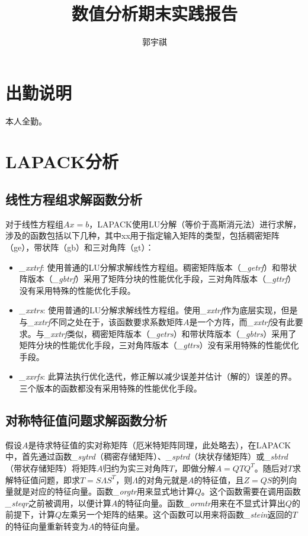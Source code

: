 \documentclass[a4paper]{article}
\begin{document}
\title{数值分析期末实践报告}
\author{郭宇祺}
\date{}
\maketitle
\normalsize
\section{出勤说明}
本人全勤。

\section{LAPACK分析}
\subsection{线性方程组求解函数分析}
对于线性方程组$Ax=b$，LAPACK使用LU分解（等价于高斯消元法）进行求解，涉及的函数包括以下几种，其中xx用于指定输入矩阵的类型，包括稠密矩阵（ge），带状阵（gb）和三对角阵（gt）：
\begin{itemize}
  \item \emph{\_xxtrf}: 使用普通的LU分解求解线性方程组。稠密矩阵版本（\emph{\_getrf}）和带状阵版本（\emph{\_gbtrf}）采用了矩阵分块的性能优化手段，三对角阵版本（\emph{\_gttrf}）没有采用特殊的性能优化手段。
  \item \emph{\_xxtrs}: 使用普通的LU分解求解线性方程组。使用\emph{\_xxtrf}作为底层实现，但是与\emph{\_xxtrf}不同之处在于，该函数要求系数矩阵$A$是一个方阵，而\emph{\_xxtrf}没有此要求。与\emph{\_xxtrf}类似，稠密矩阵版本（\emph{\_getrs}）和带状阵版本（\emph{\_gbtrs}）采用了矩阵分块的性能优化手段，三对角阵版本（\emph{\_gttrs}）没有采用特殊的性能优化手段。
  \item \emph{\_xxrfs}: 此算法执行优化迭代，修正解以减少误差并估计（解的）误差的界。三个版本的函数都没有采用特殊的性能优化手段。
\end{itemize}

\subsection{对称特征值问题求解函数分析}

假设$A$是待求特征值的实对称矩阵（厄米特矩阵同理，此处略去），在LAPACK中，首先通过函数\emph{\_sytrd}（稠密存储矩阵）、\emph{\_sptrd}（块状存储矩阵）或\emph{\_sbtrd}（带状存储矩阵）将矩阵$A$归约为实三对角阵$T$，即做分解$A=QTQ^T$。随后对$T$求解特征值问题，即求$T=S\Lambda S^T$，则$\Lambda$的对角元就是$A$的特征值，且$Z=QS$的列向量就是对应的特征向量。函数\emph{\_orgtr}用来显式地计算$Q$。这个函数需要在调用函数\emph{\_steqr}之前被调用，以便计算$A$的特征向量。函数\emph{\_ormtr}用来在不显式计算出$Q$的前提下，计算$Q$左乘另一个矩阵的结果。这个函数可以用来将函数\emph{\_stein}返回的$T$的特征向量重新转变为$A$的特征向量。
\end{document}
